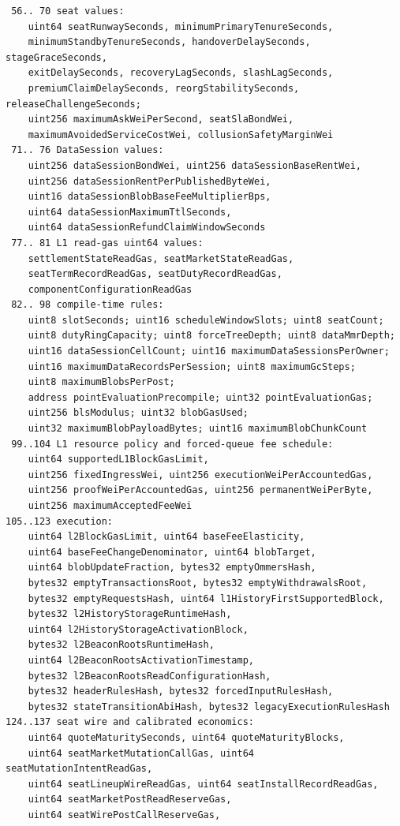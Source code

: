 \documentclass[a4paper,11pt]{article}
\begin{document}
\begin{verbatim}
 56.. 70 seat values:
    uint64 seatRunwaySeconds, minimumPrimaryTenureSeconds,
    minimumStandbyTenureSeconds, handoverDelaySeconds, stageGraceSeconds,
    exitDelaySeconds, recoveryLagSeconds, slashLagSeconds,
    premiumClaimDelaySeconds, reorgStabilitySeconds, releaseChallengeSeconds;
    uint256 maximumAskWeiPerSecond, seatSlaBondWei,
    maximumAvoidedServiceCostWei, collusionSafetyMarginWei
 71.. 76 DataSession values:
    uint256 dataSessionBondWei, uint256 dataSessionBaseRentWei,
    uint256 dataSessionRentPerPublishedByteWei,
    uint16 dataSessionBlobBaseFeeMultiplierBps,
    uint64 dataSessionMaximumTtlSeconds,
    uint64 dataSessionRefundClaimWindowSeconds
 77.. 81 L1 read-gas uint64 values:
    settlementStateReadGas, seatMarketStateReadGas,
    seatTermRecordReadGas, seatDutyRecordReadGas,
    componentConfigurationReadGas
 82.. 98 compile-time rules:
    uint8 slotSeconds; uint16 scheduleWindowSlots; uint8 seatCount;
    uint8 dutyRingCapacity; uint8 forceTreeDepth; uint8 dataMmrDepth;
    uint16 dataSessionCellCount; uint16 maximumDataSessionsPerOwner;
    uint16 maximumDataRecordsPerSession; uint8 maximumGcSteps;
    uint8 maximumBlobsPerPost;
    address pointEvaluationPrecompile; uint32 pointEvaluationGas;
    uint256 blsModulus; uint32 blobGasUsed;
    uint32 maximumBlobPayloadBytes; uint16 maximumBlobChunkCount
 99..104 L1 resource policy and forced-queue fee schedule:
    uint64 supportedL1BlockGasLimit,
    uint256 fixedIngressWei, uint256 executionWeiPerAccountedGas,
    uint256 proofWeiPerAccountedGas, uint256 permanentWeiPerByte,
    uint256 maximumAcceptedFeeWei
105..123 execution:
    uint64 l2BlockGasLimit, uint64 baseFeeElasticity,
    uint64 baseFeeChangeDenominator, uint64 blobTarget,
    uint64 blobUpdateFraction, bytes32 emptyOmmersHash,
    bytes32 emptyTransactionsRoot, bytes32 emptyWithdrawalsRoot,
    bytes32 emptyRequestsHash, uint64 l1HistoryFirstSupportedBlock,
    bytes32 l2HistoryStorageRuntimeHash,
    uint64 l2HistoryStorageActivationBlock,
    bytes32 l2BeaconRootsRuntimeHash,
    uint64 l2BeaconRootsActivationTimestamp,
    bytes32 l2BeaconRootsReadConfigurationHash,
    bytes32 headerRulesHash, bytes32 forcedInputRulesHash,
    bytes32 stateTransitionAbiHash, bytes32 legacyExecutionRulesHash
124..137 seat wire and calibrated economics:
    uint64 quoteMaturitySeconds, uint64 quoteMaturityBlocks,
    uint64 seatMarketMutationCallGas, uint64 seatMutationIntentReadGas,
    uint64 seatLineupWireReadGas, uint64 seatInstallRecordReadGas,
    uint64 seatMarketPostReadReserveGas,
    uint64 seatWirePostCallReserveGas,

\end{verbatim}
\end{document}
